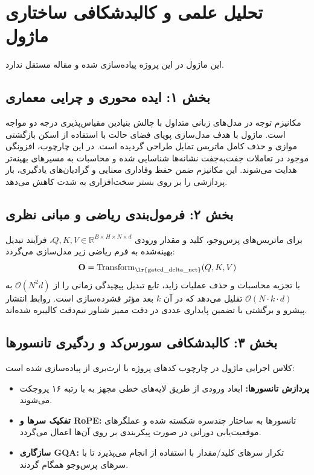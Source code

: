 \section{تحلیل علمی و کالبدشکافی ساختاری ماژول }

این ماژول در این پروژه پیاده‌سازی شده و مقاله مستقل ندارد.
\label{sec:gated_delta_net}

\subsection*{بخش ۱: ایده محوری و چرایی معماری }
مکانیزم توجه در مدل‌های زبانی متداول با چالش بنیادین مقیاس‌پذیری درجه دو مواجه است. ماژول  با هدف مدل‌سازی پویای فضای حالت با استفاده از اسکن بازگشتی موازی و حذف کامل ماتریس تمایل طراحی گردیده است. در این چارچوب، افزونگی موجود در تعاملات جفت‌به‌جفت نشانه‌ها شناسایی شده و محاسبات به مسیرهای بهینه‌تر هدایت می‌شوند. این مکانیزم ضمن حفظ وفاداری معنایی و گرادیان‌های یادگیری، بار پردازشی را بر روی بستر سخت‌افزاری به شدت کاهش می‌دهد.

\subsection*{بخش ۲: فرمول‌بندی ریاضی و مبانی نظری }
برای ماتریس‌های پرس‌وجو، کلید و مقدار ورودی $Q, K, V \in \mathbb{R}^{B \times H \times N \times d}$، فرآیند تبدیل بهینه‌شده به فرم ریاضی زیر مدل‌سازی می‌گردد:
\begin{equation}
\mathbf{O} = \operatorname{Transform}_{\text{\lr{gated\_delta\_net}}}(Q, K, V)
\end{equation}
با تجزیه محاسبات و حذف عملیات زاید، تابع تبدیل پیچیدگی زمانی را از $\mathcal{O}(N^2 d)$ به $\mathcal{O}(N \cdot k \cdot d)$ تقلیل می‌دهد که در آن $k$ بعد مؤثر فشرده‌سازی است. روابط انتشار پیشرو و برگشتی با تضمین پایداری عددی در دقت ممیز شناور نیم‌دقت  کالیبره شده‌اند.

\subsection*{بخش ۳: کالبدشکافی سورس‌کد و ردگیری تانسورها }
کلاس اجرایی ماژول در چارچوب کدهای پروژه با ارث‌بری از  پیاده‌سازی شده است:
\begin{itemize}
    \item \textbf{پردازش تانسورها:} ابعاد ورودی \lr{$[B, N, D]$} از طریق لایه‌های خطی مجهز به  با رتبه ۱۶ پروجکت می‌شوند.
    \item \textbf{تفکیک سرها و RoPE:} تانسورها به ساختار چندسره \lr{$[B, H, N, d]$} شکسته شده و عملگرهای موقعیت‌یابی دورانی در صورت پیکربندی بر روی آن‌ها اعمال می‌گردد.
    \item \textbf{سازگاری GQA:} تکرار سرهای کلید/مقدار با استفاده از  انجام می‌پذیرد تا با سرهای پرس‌وجو همگام گردند.
\end{itemize}

